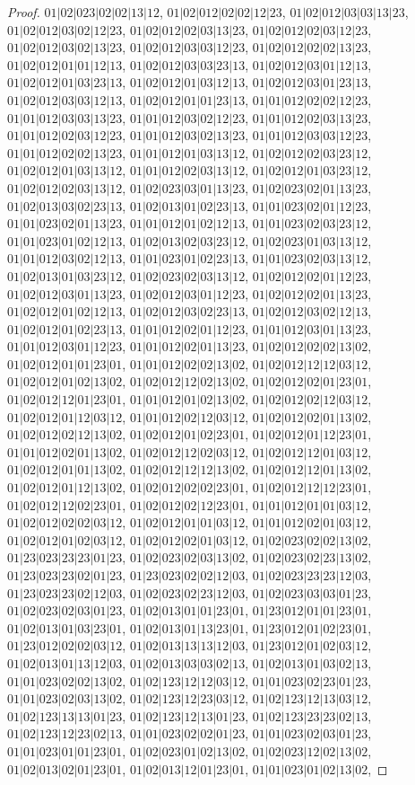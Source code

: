 \documentclass[12pt]{article}
\theoremstyle{plain}
\theoremstyle{definition}
\theoremstyle{remark}
\begin{document}
\begin{proof}
$01|02|023|02|02|13|12$, $01|02|012|02|02|12|23$, $01|02|012|03|03|13|23$, $01|02|012|03|02|12|23$, $01|02|012|02|03|13|23$, $01|02|012|02|03|12|23$, $01|02|012|03|02|13|23$, $01|02|012|03|03|12|23$, $01|02|012|02|02|13|23$, $01|02|012|01|01|12|13$, $01|02|012|03|03|23|13$, $01|02|012|03|01|12|13$, $01|02|012|01|03|23|13$, $01|02|012|01|03|12|13$, $01|02|012|03|01|23|13$, $01|02|012|03|03|12|13$, $01|02|012|01|01|23|13$, $01|01|012|02|02|12|23$, $01|01|012|03|03|13|23$, $01|01|012|03|02|12|23$, $01|01|012|02|03|13|23$, $01|01|012|02|03|12|23$, $01|01|012|03|02|13|23$, $01|01|012|03|03|12|23$, $01|01|012|02|02|13|23$, $01|01|012|01|03|13|12$, $01|02|012|02|03|23|12$, $01|02|012|01|03|13|12$, $01|01|012|02|03|13|12$, $01|02|012|01|03|23|12$, $01|02|012|02|03|13|12$, $01|02|023|03|01|13|23$, $01|02|023|02|01|13|23$, $01|02|013|03|02|23|13$, $01|02|013|01|02|23|13$, $01|01|023|02|01|12|23$, $01|01|023|02|01|13|23$, $01|01|012|01|02|12|13$, $01|01|023|02|03|23|12$, $01|01|023|01|02|12|13$, $01|02|013|02|03|23|12$, $01|02|023|01|03|13|12$, $01|01|012|03|02|12|13$, $01|01|023|01|02|23|13$, $01|01|023|02|03|13|12$, $01|02|013|01|03|23|12$, $01|02|023|02|03|13|12$, $01|02|012|02|01|12|23$, $01|02|012|03|01|13|23$, $01|02|012|03|01|12|23$, $01|02|012|02|01|13|23$, $01|02|012|01|02|12|13$, $01|02|012|03|02|23|13$, $01|02|012|03|02|12|13$, $01|02|012|01|02|23|13$, $01|01|012|02|01|12|23$, $01|01|012|03|01|13|23$, $01|01|012|03|01|12|23$, $01|01|012|02|01|13|23$, $01|02|012|02|02|13|02$, $01|02|012|01|01|23|01$, $01|01|012|02|02|13|02$, $01|02|012|12|12|03|12$, $01|02|012|01|02|13|02$, $01|02|012|12|02|13|02$, $01|02|012|02|01|23|01$, $01|02|012|12|01|23|01$, $01|01|012|01|02|13|02$, $01|02|012|02|12|03|12$, $01|02|012|01|12|03|12$, $01|01|012|02|12|03|12$, $01|02|012|02|01|13|02$, $01|02|012|02|12|13|02$, $01|02|012|01|02|23|01$, $01|02|012|01|12|23|01$, $01|01|012|02|01|13|02$, $01|02|012|12|02|03|12$, $01|02|012|12|01|03|12$, $01|02|012|01|01|13|02$, $01|02|012|12|12|13|02$, $01|02|012|12|01|13|02$, $01|02|012|01|12|13|02$, $01|02|012|02|02|23|01$, $01|02|012|12|12|23|01$, $01|02|012|12|02|23|01$, $01|02|012|02|12|23|01$, $01|01|012|01|01|03|12$, $01|02|012|02|02|03|12$, $01|02|012|01|01|03|12$, $01|01|012|02|01|03|12$, $01|02|012|01|02|03|12$, $01|02|012|02|01|03|12$, $01|02|023|02|02|13|02$, $01|23|023|23|23|01|23$, $01|02|023|02|03|13|02$, $01|02|023|02|23|13|02$, $01|23|023|23|02|01|23$, $01|23|023|02|02|12|03$, $01|02|023|23|23|12|03$, $01|23|023|23|02|12|03$, $01|02|023|02|23|12|03$, $01|02|023|03|03|01|23$, $01|02|023|02|03|01|23$, $01|02|013|01|01|23|01$, $01|23|012|01|01|23|01$, $01|02|013|01|03|23|01$, $01|02|013|01|13|23|01$, $01|23|012|01|02|23|01$, $01|23|012|02|02|03|12$, $01|02|013|13|13|12|03$, $01|23|012|01|02|03|12$, $01|02|013|01|13|12|03$, $01|02|013|03|03|02|13$, $01|02|013|01|03|02|13$, $01|01|023|02|02|13|02$, $01|02|123|12|12|03|12$, $01|01|023|02|23|01|23$, $01|01|023|02|03|13|02$, $01|02|123|12|23|03|12$, $01|02|123|12|13|03|12$, $01|02|123|13|13|01|23$, $01|02|123|12|13|01|23$, $01|02|123|23|23|02|13$, $01|02|123|12|23|02|13$, $01|01|023|02|02|01|23$, $01|01|023|02|03|01|23$, $01|01|023|01|01|23|01$, $01|02|023|01|02|13|02$, $01|02|023|12|02|13|02$, $01|02|013|02|01|23|01$, $01|02|013|12|01|23|01$, $01|01|023|01|02|13|02$, 
\end{proof}
\end{document}
